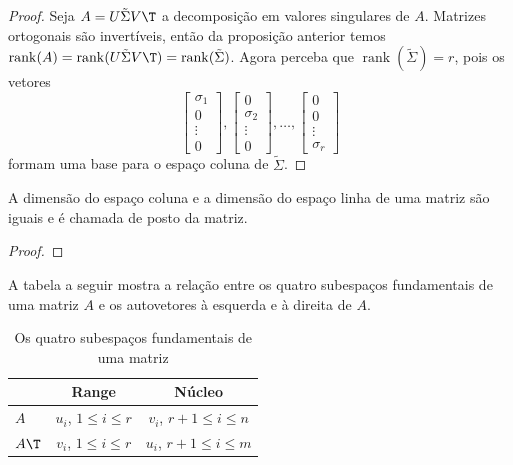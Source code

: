 \documentclass{article}
\DeclareMathOperator{\rank}{rank}
\begin{document}
\begin{proof}
    Seja \(A = U\tilde{\Sigma}V\T \) a decomposição em valores singulares de \(A\). Matrizes ortogonais são invertíveis, então da proposição anterior temos \(\rank(A) = \rank(U\tilde{\Sigma}V\T )= \rank(\tilde{\Sigma})\). Agora perceba que \(\rank(\tilde{\Sigma})=r\), pois os vetores 
    \[
        \begin{bmatrix}
            \sigma_1 \\
            0 \\
            \vdots \\
            0
        \end{bmatrix}, 
        \begin{bmatrix}
            0 \\
            \sigma_2 \\
            \vdots \\
            0
        \end{bmatrix}, 
        \ldots, 
        \begin{bmatrix}
            0 \\
            0 \\
            \vdots \\
            \sigma_r
        \end{bmatrix}
    \] formam uma base para o espaço coluna de \(\tilde{\Sigma}\).
\end{proof}

\begin{prop}
    A dimensão do espaço coluna e a dimensão do espaço linha de uma matriz são iguais e é chamada de posto da matriz.
\end{prop}

\begin{proof}
    
\end{proof}

A tabela a seguir mostra a relação entre os quatro subespaços fundamentais de uma matriz \(A\) e os autovetores à esquerda e à direita de \(A\).

\begin{table}
    \centering
    \caption{Os quatro subespaços fundamentais de uma matriz}
    \begin{tabular}{lcc}
        \toprule
        & \textbf{Range} & \textbf{Núcleo} \\
        \midrule
        \(A\) & \(u_i\), \(1 \leq i \leq r\) & \(v_i\), \(r+1 \leq i \leq n\) \\
        \(A\T \) & \(v_i\), \(1 \leq i \leq r\) & \(u_i\), \(r+1 \leq i \leq m\) \\
        \bottomrule
    \end{tabular}    
\end{table}
\end{document}
